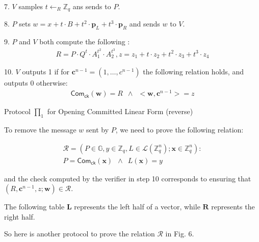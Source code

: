 \documentclass[11pt,a4]{article}
\newcommand{\Com}{\mathsf{Com}}
\newcommand{\ZZ}        {\mathbb{Z}}
\newcommand{\RRR}{\mathcal{R}}
\newcommand{\LLL}{\mathcal{L}}
\newcommand{\group}{\mathbb{G}}
\begin{document}
{7. $V$ samples $t \leftarrow _R \ZZ_q$ ans sends to $P$.

8. $P$ sets $w = x + t \cdot B + t^2 \cdot \textbf{p}_L + t^3 \cdot \textbf{p}_R$ and sends $w$ to $V$.

9. $P$ and $V$ both compute the following :
\begin{align*}
    R = P\cdot Q^t \cdot A_1^{t^2}\cdot A_2^{t^3}, z=z_1+t\cdot z_2 +t^2\cdot z_3+t^3\cdot z_4
\end{align*}

10. $V$ outputs 1 if for $\textbf{c}^{n-1}=(1, \ldots, c^{n-1})$ the following relation holds, and outputs 0 otherwise:
\begin{align*}
    \Com_{\mathsf{ck}}(\textbf{w})=R \enspace \land \enspace <\textbf{w}, \textbf{c}^{n-1}>=z
\end{align*}

}{Protocol $\prod_1$ for Opening Committed Linear Form (reverse) \label{fig:alg_unit}}


To remove the message $w$ sent by $P$, we need to prove the following relation:

\begin{align*}
    \RRR=(P\in\group,y\in\ZZ_q,L\in\LLL(\ZZ_q^n);\textbf{x}\in\ZZ_q^n):\\
    P=\Com_{\mathsf{ck}}(\textbf{x})\enspace \land \enspace L(\textbf{x})=y
\end{align*}

and the check computed by the verifier in step 10 corresponds to ensuring that $(R,\textbf{c}^{n-1},z;\textbf{w}) \in \RRR$.

The following table $\textbf{L}$ represents the left half of a vector, while $\textbf{R}$ represents the right half.

So here is another protocol to prove the relation $\RRR$ in Fig. 6.
\end{document}
